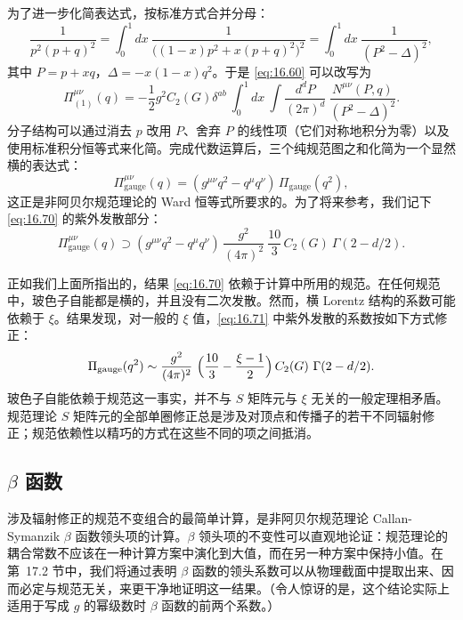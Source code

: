 为了进一步化简表达式，按标准方式合并分母：
\begin{equation}
  \frac{1}{p^2(p+q)^2} = \int_0^1 dx\ \frac{1}{\bigl( (1-x)p^2 + x(p+q)^2
    \bigr)^2} = \int_0^1 dx\ \frac{1}{(P^2-\Delta)^2} ,
  \label{eq:16.61}
\end{equation}
其中 $P = p + xq$，$\Delta = -x(1-x)q^2$。于是 \eqref{eq:16.60} 可以改写为
\begin{equation}
  \Pi^{\mu\nu}_{(1)}(q) = -\frac{1}{2}g^2C_2(G)\delta^{ab}\ \int_0^1 dx\
    \int \frac{d^dP}{(2\pi)^d}\ \frac{N^{\mu\nu}(P,q)}{(P^2-\Delta)^2} .
  \label{eq:16.62}
\end{equation}
分子结构可以通过消去 $p$ 改用 $P$、舍弃 $P$ 的线性项（它们对称地积分为零）以及使用标准积分恒等式来化简。完成代数运算后，三个纯规范图之和化简为一个显然横的表达式：
\begin{equation}
  \Pi^{\mu\nu}_{\mathrm{gauge}}(q) = (g^{\mu\nu}q^2 - q^\mu q^\nu)\,
    \Pi_{\mathrm{gauge}}(q^2) ,
  \label{eq:16.70}
\end{equation}
这正是非阿贝尔规范理论的 Ward 恒等式所要求的。为了将来参考，我们记下 \eqref{eq:16.70} 的紫外发散部分：
\begin{equation}
  \Pi^{\mu\nu}_{\mathrm{gauge}}(q) \supset (g^{\mu\nu}q^2 - q^\mu q^\nu)\,
    \frac{g^2}{(4\pi)^2}\ \frac{10}{3}\,C_2(G)\ \Gamma(2-d/2) .
  \label{eq:16.71}
\end{equation}

正如我们上面所指出的，结果 \eqref{eq:16.70} 依赖于计算中所用的规范。在任何规范中，玻色子自能都是横的，并且没有二次发散。然而，横 Lorentz 结构的系数可能依赖于 $\xi$。结果发现，对一般的 $\xi$ 值，\eqref{eq:16.71} 中紫外发散的系数按如下方式修正：
\begin{equation}
  \Pi_{\mathrm{gauge}}(q^2) \sim \frac{g^2}{(4\pi)^2}\ \Bigl( \frac{10}{3}
    - \frac{\xi-1}{2} \Bigr)\,C_2(G)\ \Gamma(2-d/2) .
  \label{eq:16.72}
\end{equation}
玻色子自能依赖于规范这一事实，并不与 $S$ 矩阵元与 $\xi$ 无关的一般定理相矛盾。规范理论 $S$ 矩阵元的全部单圈修正总是涉及对顶点和传播子的若干不同辐射修正；规范依赖性以精巧的方式在这些不同的项之间抵消。

\subsection{$\beta$ 函数}

涉及辐射修正的规范不变组合的最简单计算，是非阿贝尔规范理论 Callan-Symanzik $\beta$ 函数领头项的计算。$\beta$ 领头项的不变性可以直观地论证：规范理论的耦合常数不应该在一种计算方案中演化到大值，而在另一种方案中保持小值。在第~17.2 节中，我们将通过表明 $\beta$ 函数的领头系数可以从物理截面中提取出来、因而必定与规范无关，来更干净地证明这一结果。（令人惊讶的是，这个结论实际上适用于写成 $g$ 的幂级数时 $\beta$ 函数的前两个系数。）

